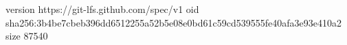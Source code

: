 version https://git-lfs.github.com/spec/v1
oid sha256:3b4be7cbeb396dd6512255a52b5e08e0bd61c59cd539555fe40afa3e93e410a2
size 87540

